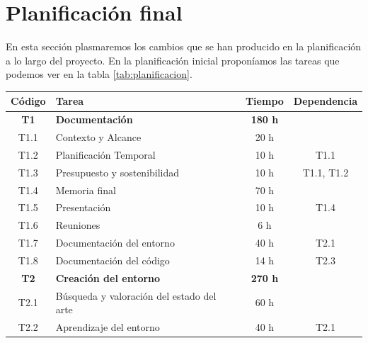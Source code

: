 \section{Planificación final}
En esta sección plasmaremos los cambios que se han producido en la planificación a lo largo del proyecto. En la planificación inicial proponíamos las tareas que podemos ver en la tabla \ref {tab:planificacion}.

\begin{table}[h]
	\begin{center}
		\begin{tabular}{| c | l | c | c |}
			\hline
			\textbf{Código} & \textbf{Tarea}                               & \textbf{Tiempo} & \textbf{Dependencia} \\ \hline
			\textbf{T1}     & \textbf{Documentación}                       & \textbf{180 h}  &                      \\ \hline
			T1.1            & Contexto y Alcance                           & 20 h            &                      \\
			T1.2            & Planificación Temporal                       & 10 h            & T1.1                 \\
			T1.3            & Presupuesto y sostenibilidad                 & 10 h            & T1.1, T1.2           \\
			T1.4            & Memoria final                                & 70 h            &                      \\
			T1.5            & Presentación                                 & 10 h            & T1.4                 \\
			T1.6            & Reuniones                                    & 6 h             &                      \\
			T1.7            & Documentación del entorno                    & 40 h            & T2.1                 \\
			T1.8            & Documentación del código                     & 14 h            & T2.3                 \\
			\hline
			\textbf{T2}     & \textbf{Creación del entorno}                & \textbf{270 h}  &                      \\ \hline
			T2.1            & Búsqueda y valoración del estado del arte    & 60 h            &                      \\
			T2.2            & Aprendizaje del entorno                      & 40 h            & T2.1                 \\

\end{tabular}
\end{center}
\end{table}
